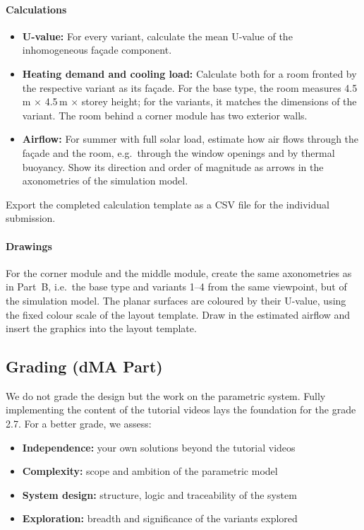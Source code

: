 \paragraph{Calculations}
\begin{itemize}
  \item \textbf{U-value:} For every variant, calculate the mean U-value of the inhomogeneous façade component.
  \item \textbf{Heating demand and cooling load:} Calculate both for a room fronted by the respective variant as its façade. For the base type, the room measures 4.5\,m × 4.5\,m × storey height; for the variants, it matches the dimensions of the variant. The room behind a corner module has two exterior walls.
  \item \textbf{Airflow:} For summer with full solar load, estimate how air flows through the façade and the room, e.g.~through the window openings and by thermal buoyancy. Show its direction and order of magnitude as arrows in the axonometries of the simulation model.
\end{itemize}
Export the completed calculation template as a CSV file for the individual submission.
\paragraph{Drawings}
For the corner module and the middle module, create the same axonometries as in Part~B, i.e.~the base type and variants 1–4 from the same viewpoint, but of the simulation model. The planar surfaces are coloured by their U-value, using the fixed colour scale of the layout template. Draw in the estimated airflow and insert the graphics into the layout template.
\subsection{Grading (dMA Part)}
We do not grade the design but the work on the parametric system. Fully implementing the content of the tutorial videos lays the foundation for the grade 2.7. For a better grade, we assess:
\begin{itemize}
  \item \textbf{Independence:} your own solutions beyond the tutorial videos
  \item \textbf{Complexity:} scope and ambition of the parametric model
  \item \textbf{System design:} structure, logic and traceability of the system
  \item \textbf{Exploration:} breadth and significance of the variants explored
\end{itemize}
